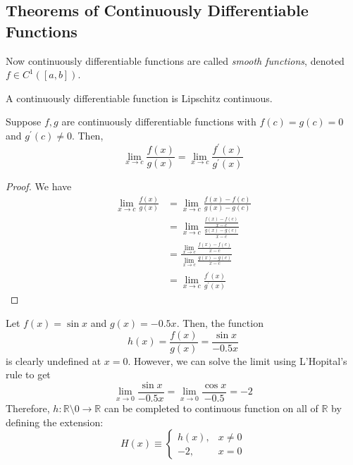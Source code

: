 \subsection{Theorems of Continuously Differentiable Functions}

  Now continuously differentiable functions are called \textit{smooth functions}, denoted $f \in C^1([a, b])$. 

  \begin{theorem}
    A continuously differentiable function is Lipschitz continuous. 
  \end{theorem}

  \begin{theorem}
    Suppose $f, g$ are continuously differentiable functions with $f(c) = g(c) = 0$ and $g^\prime (c) \neq 0$. Then, 
    \begin{equation}
      \lim_{x \to c} \frac{f(x)}{g(x)} = \lim_{x \to c} \frac{f^\prime (x)}{g^\prime (x)}
    \end{equation}
  \end{theorem}
  \begin{proof}
    We have 
    \begin{align}
      \lim_{x \to c} \frac{f(x)}{g(x)} & = \lim_{x \to c} \frac{f(x) - f(c)}{g(x) - g(c)} \\ 
                                       & = \lim_{x \to c} \frac{\frac{f(x) - f(c)}{x -  c}}{\frac{g(x) - g(c)}{x - c}} \\ 
                                       & = \frac{\lim_{x \to c} \frac{f(x) - f(c)}{x - c}}{\lim_{x \to c} \frac{g(x) - g(c)}{x - c}} \\ 
                                       & = \lim_{x \to c} \frac{f^\prime (x)}{g^\prime (x)}
    \end{align}
  \end{proof}

  \begin{example}
    Let $f(x) = \sin{x}$ and $g(x) = -0.5x$. Then, the function 
    \begin{equation}
      h(x) = \frac{f(x)}{g(x)} = \frac{\sin{x}}{-0.5x}
    \end{equation}
    is clearly undefined at $x = 0$. 
    However, we can solve the limit using L'Hopital's rule to get
    \begin{equation}
      \lim_{x \rightarrow 0} \frac{\sin{x}}{-0.5x} = \lim_{x \rightarrow 0} \frac{\cos{x}}{-0.5} = -2
    \end{equation}
    Therefore, $h: \mathbb{R} \setminus 0 \longrightarrow \mathbb{R}$ can be completed to continuous function on all of $\mathbb{R}$ by defining the extension: 
    \begin{equation}
      H(x) \equiv \begin{cases} h(x), & x \neq 0 \\ -2, & x = 0 \end{cases} 
    \end{equation}
  \end{example}


